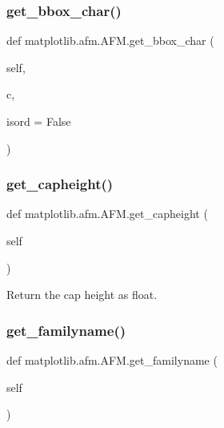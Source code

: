 \subsubsection{\texorpdfstring{get\+\_\+bbox\+\_\+char()}{get\_bbox\_char()}}
{\footnotesize\ttfamily def matplotlib.\+afm.\+A\+F\+M.\+get\+\_\+bbox\+\_\+char (\begin{DoxyParamCaption}\item[{}]{self,  }\item[{}]{c,  }\item[{}]{isord = {\ttfamily False} }\end{DoxyParamCaption})}

\mbox{\label{classmatplotlib_1_1afm_1_1AFM_a08d93b650a4c492129ad0eb2647ac614}} 
\subsubsection{\texorpdfstring{get\+\_\+capheight()}{get\_capheight()}}
{\footnotesize\ttfamily def matplotlib.\+afm.\+A\+F\+M.\+get\+\_\+capheight (\begin{DoxyParamCaption}\item[{}]{self }\end{DoxyParamCaption})}

\begin{DoxyVerb}Return the cap height as float.\end{DoxyVerb}
 \mbox{\label{classmatplotlib_1_1afm_1_1AFM_ab571740be829d14c1d6e20fb612e50f0}} 
\subsubsection{\texorpdfstring{get\+\_\+familyname()}{get\_familyname()}}
{\footnotesize\ttfamily def matplotlib.\+afm.\+A\+F\+M.\+get\+\_\+familyname (\begin{DoxyParamCaption}\item[{}]{self }\end{DoxyParamCaption})}

